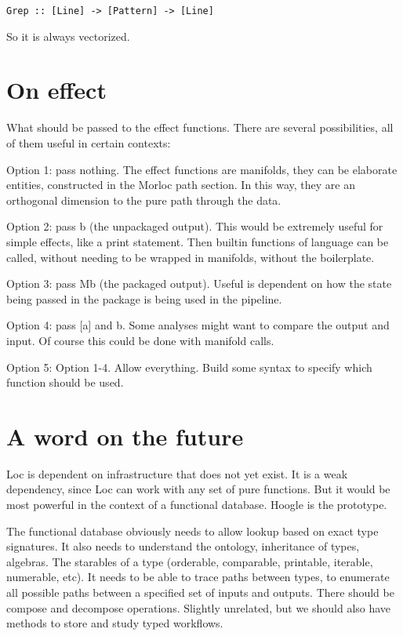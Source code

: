 \documentclass[12pt]{article}
\begin{document}
\begin{verbatim}
Grep :: [Line] -> [Pattern] -> [Line]
\end{verbatim}

So it is always vectorized.

\section{On effect}

What should be passed to the effect functions. There are several possibilities,
all of them useful in certain contexts:

Option 1: pass nothing. The effect functions are manifolds, they can be
elaborate entities, constructed in the Morloc path section. In this way, they are
an orthogonal dimension to the pure path through the data.

Option 2: pass b (the unpackaged output). This would be extremely useful for
simple effects, like a print statement. Then builtin functions of language can
be called, without needing to be wrapped in manifolds, without the boilerplate.

Option 3: pass Mb (the packaged output). Useful is dependent on how the state
being passed in the package is being used in the pipeline.

Option 4: pass [a] and b. Some analyses might want to compare the output and
input. Of course this could be done with manifold calls.

Option 5: Option 1-4. Allow everything. Build some syntax to specify which
function should be used.

\section{A word on the future}

Loc is dependent on infrastructure that does not yet exist. It is a weak
dependency, since Loc can work with any set of pure functions. But it would be
most powerful in the context of a functional database. Hoogle is the prototype.

The functional database obviously needs to allow lookup based on exact type
signatures. It also needs to understand the ontology, inheritance of types,
algebras. The starables of a type (orderable, comparable, printable, iterable,
numerable, etc). It needs to be able to trace paths between types, to enumerate
all possible paths between a specified set of inputs and outputs. There should
be compose and decompose operations. Slightly unrelated, but we should also
have methods to store and study typed workflows.
\end{document}
